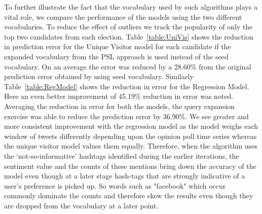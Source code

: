 To further illustrate the fact that the vocabulary used by such algorithms plays a vital role, we compare the performance of the models using the two different vocabularies.
To reduce the effect of outliers we track the popularity of only the top two candidates from each election.
Table~\ref{table:UniVis} shows the reduction in prediction error for the Unique Visitor model for each candidate if the expanded vocabulary from the PSL approach is used instead of the seed vocabulary.
On an average the error was reduced by a 28.60\% from the original prediction error obtained by using seed vocabulary.
Similarly Table~\ref{table:RegModel} shows the reduction in error for the Regression Model.
Here an even better improvement of 45.19\% reduction in error was noted.
Averaging the reduction in error for both the models, the query expansion exercise was able to reduce the prediction error by  36.90\%.
We see greater and more consistent improvement with the regression model as the model weighs each window of tweets differently depending upon the opinion poll time series whereas the unique visitor model values them equally. 
Therefore, when the algorithm uses the `not-so-informative' hashtags identified during 
the earlier iterations, the sentiment value and the counts of these mentions bring down the accuracy of the model even though at a later stage hash-tags that are strongly indicative of a user's preference is picked up.
So words such as "facebook" which occur commonly dominate the counts and therefore skew the results even though they are dropped from the vocabulary at a later point.
